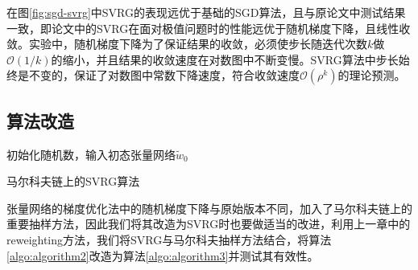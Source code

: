 在图\ref{fig:sgd-svrg}中SVRG的表现远优于基础的SGD算法，且与原论文中测试结果一致，即论文中的SVRG在面对极值问题时的性能远优于随机梯度下降，且线性收敛。实验中，随机梯度下降为了保证结果的收敛，必须使步长随迭代次数$k$做$\mathcal{O}(1/k)$的缩小，并且结果的收敛速度在对数图中不断变慢。SVRG算法中步长始终是不变的，保证了对数图中常数下降速度，符合收敛速度$\mathcal{O}(\rho^k)$的理论预测。

\subsection{算法改造}

\begin{algorithm}[htb]
	
	
	初始化随机数，输入初态张量网络$\tilde{w}_0$\;
	\caption{马尔科夫链上的SVRG算法}
	\label{algo:algorithm3}
\end{algorithm}

张量网络的梯度优化法中的随机梯度下降与原始版本不同，加入了马尔科夫链上的重要抽样方法，因此我们将其改造为SVRG时也要做适当的改进，利用上一章中的reweighting方法，我们将SVRG与马尔科夫抽样方法结合，将算法\ref{algo:algorithm2}改造为算法\ref{algo:algorithm3}并测试其有效性。

